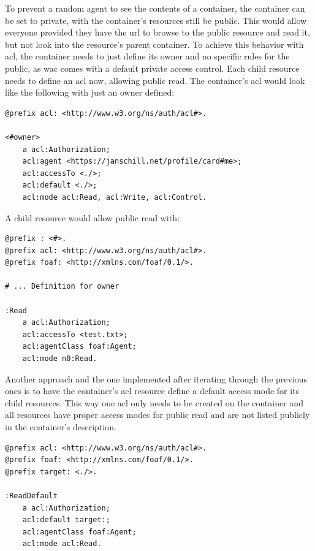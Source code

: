 To prevent a random agent to see the contents of a container, the container can be set to private, with the container’s resources still be public. This would allow everyone provided they have the \gls{url} to browse to the public resource and read it, but not look into the resource’s parent container. To achieve this behavior with \gls{acl}, the container needs to just define its owner and no specific rules for the public, as \gls{wac} comes with a default private access control. Each child resource needs to define an \gls{acl} now, allowing public read.
The container’s \gls{acl} would look like the following with just an owner defined:

\begin{lstlisting}[language=Other,columns=fullflexible, caption={TODO: Label caption}, label={lst:2}]
@prefix acl: <http://www.w3.org/ns/auth/acl#>.

<#owner>
    a acl:Authorization;
    acl:agent <https://janschill.net/profile/card#me>;
    acl:accessTo <./>;
    acl:default <./>;
    acl:mode acl:Read, acl:Write, acl:Control.
\end{lstlisting}

A child resource would allow public read with:

\begin{lstlisting}[language=Other,columns=fullflexible, caption={TODO: Label caption}, label={lst:3}]
@prefix : <#>.
@prefix acl: <http://www.w3.org/ns/auth/acl#>.
@prefix foaf: <http://xmlns.com/foaf/0.1/>.

# ... Definition for owner

:Read
    a acl:Authorization;
    acl:accessTo <test.txt>;
    acl:agentClass foaf:Agent;
    acl:mode n0:Read.
\end{lstlisting}

Another approach and the one implemented after iterating through the previous ones is to have the container’s \gls{acl} resource define a default access mode for its child resources. This way one \gls{acl} only needs to be created on the container and all resources have proper access modes for public read and are not listed publicly in the container’s description.

\begin{lstlisting}[language=Other,columns=fullflexible, caption={TODO: Label caption}, label={lst:4}]
@prefix acl: <http://www.w3.org/ns/auth/acl#>.
@prefix foaf: <http://xmlns.com/foaf/0.1/>.
@prefix target: <./>.

:ReadDefault
    a acl:Authorization;
    acl:default target:;
    acl:agentClass foaf:Agent;
    acl:mode acl:Read.
\end{lstlisting}
\vspace{0.5cm}
